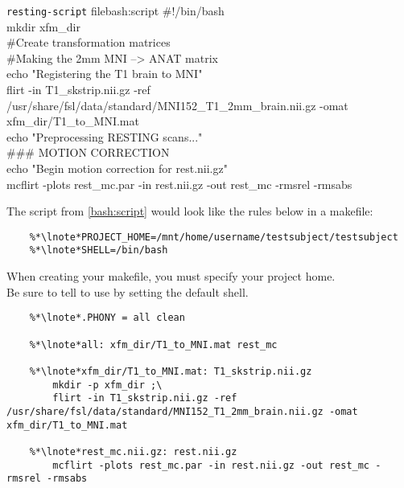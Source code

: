 \begin{bash}{\texttt{resting-script} file}{bash:script}
\#!/bin/bash \\

mkdir xfm_dir \\

\#Create transformation matrices \\

\#Making the 2mm MNI --> ANAT matrix \\
echo "Registering the T1 brain to MNI" \\
flirt -in T1_skstrip.nii.gz -ref /usr/share/fsl/data/standard/MNI152_T1_2mm_brain.nii.gz -omat xfm_dir/T1_to_MNI.mat \\
echo "Preprocessing RESTING scans..." \\

\#\#\# MOTION CORRECTION \\
echo "Begin motion correction for rest.nii.gz" \\
mcflirt -plots rest_mc.par -in rest.nii.gz -out rest_mc -rmsrel -rmsabs 
\end{bash}

\setcounter{codehighlight}{0}
The script from \autoref{bash:script} would look like the rules below in a makefile: %
\begin{lstlisting}
	%*\lnote*PROJECT_HOME=/mnt/home/username/testsubject/testsubject
	%*\lnote*SHELL=/bin/bash
\end{lstlisting}
When creating your makefile, you must specify your project home. \\
Be sure to tell \maken{} to use \bashn{} by setting the default shell. \\	

\begin{lstlisting}
	%*\lnote*.PHONY = all clean	
	
	%*\lnote*all: xfm_dir/T1_to_MNI.mat rest_mc

	%*\lnote*xfm_dir/T1_to_MNI.mat: T1_skstrip.nii.gz 
		mkdir -p xfm_dir ;\
		flirt -in T1_skstrip.nii.gz -ref /usr/share/fsl/data/standard/MNI152_T1_2mm_brain.nii.gz -omat xfm_dir/T1_to_MNI.mat

	%*\lnote*rest_mc.nii.gz: rest.nii.gz
		mcflirt -plots rest_mc.par -in rest.nii.gz -out rest_mc -rmsrel -rmsabs
\end{lstlisting}

